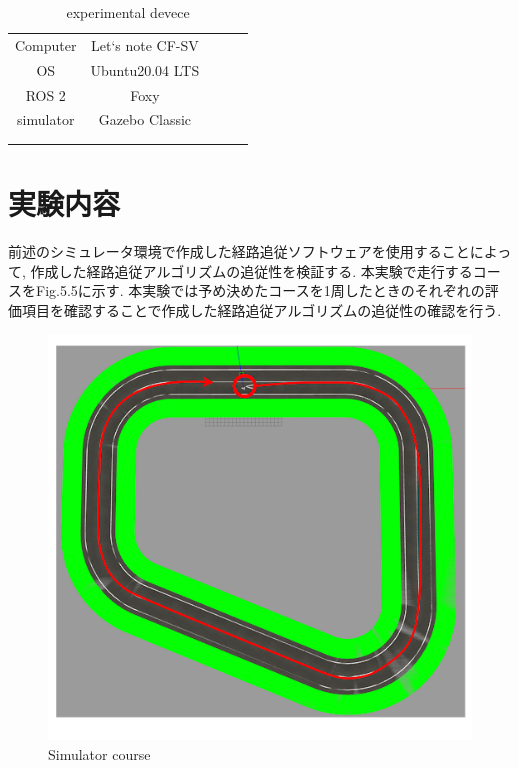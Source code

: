 \begin{table}[H]
  \centering
  \caption{experimental devece}
  \begin{tabular}{cclll}
  \cline{1-2}
  Computer             & Let`s note CF-SV &  &  &  \\
  OS                   & Ubuntu20.04 LTS  &  &  &  \\
  ROS 2                & Foxy             &  &  &  \\
  simulator            & Gazebo Classic   &  &  &  \\
  \multicolumn{1}{l}{} &                  &  &  &  \\
  \multicolumn{1}{l}{} &                  &  &  & 
  \end{tabular}
\end{table}

\section{実験内容}
前述のシミュレータ環境で作成した経路追従ソフトウェアを使用することによって, 作成した経路追従アルゴリズムの追従性を検証する.
本実験で走行するコースをFig.5.5に示す.
本実験では予め決めたコースを1周したときのそれぞれの評価項目を確認することで作成した経路追従アルゴリズムの追従性の確認を行う.

\begin{figure}[H]
  \centering
 \includegraphics[keepaspectratio, scale=0.6]
      {images/simulatorpath.png}
 \caption{Simulator course}
 \label{fig:simulator}
\end{figure}


